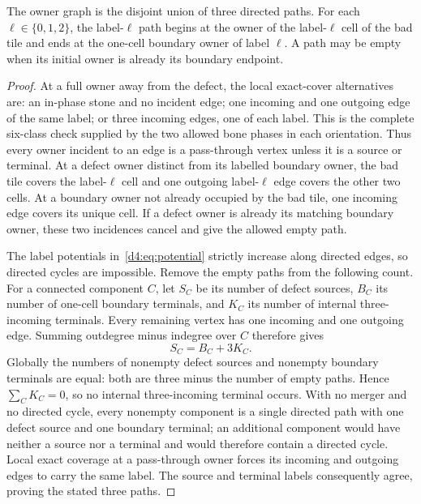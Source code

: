\begin{lemma}\label{d4:lem:three-paths}
The owner graph is the disjoint union of three directed paths.  For each
$\ell\in\{0,1,2\}$, the label-$\ell$ path begins at the owner of the
label-$\ell$ cell of the bad tile and ends at the one-cell boundary owner of
label $\ell$.  A path may be empty when its initial owner is already its
boundary endpoint.
\end{lemma}

\begin{proof}
At a full owner away from the defect, the local exact-cover alternatives are:
an in-phase stone and no incident edge; one incoming and one outgoing edge of
the same label; or three incoming edges, one of each label.  This is the
complete six-class check supplied by the two allowed bone phases in each
orientation.  Thus every owner incident to an edge is a pass-through vertex
unless it is a source or terminal.  At a defect owner distinct from its
labelled boundary owner, the bad tile covers the label-$\ell$ cell and one
outgoing label-$\ell$ edge covers the other two cells.  At a boundary owner
not already occupied by the bad tile, one incoming edge covers its unique
cell.  If a defect owner is already its matching boundary owner, these two
incidences cancel and give the allowed empty path.

The label potentials in~\eqref{d4:eq:potential} strictly increase along
directed edges, so directed cycles are impossible.  Remove the empty paths
from the following count.  For a connected component $C$, let $S_C$ be its
number of defect sources, $B_C$ its number of one-cell boundary terminals,
and $K_C$ its number of internal three-incoming terminals.  Every remaining
vertex has one incoming and one outgoing edge.  Summing outdegree minus
indegree over $C$ therefore gives
\[
 S_C=B_C+3K_C.
\]
Globally the numbers of nonempty defect sources and nonempty boundary
terminals are equal: both are three minus the number of empty paths.  Hence
$\sum_C K_C=0$, so no internal three-incoming terminal occurs.  With no
merger and no directed cycle, every nonempty component is a single directed
path with one defect source and one boundary terminal; an additional
component would have neither a source nor a terminal and would therefore
contain a directed cycle.  Local exact coverage at a pass-through owner
forces its incoming and outgoing edges to carry the same label.  The source
and terminal labels consequently agree, proving the stated three paths.
\end{proof}

